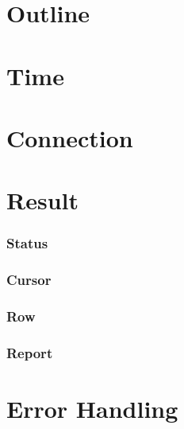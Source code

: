 \section{Outline}

\section{Time}

\section{Connection}

\section{Result}

\subsubsection{Status}
\subsubsection{Cursor}
\subsubsection{Row}
\subsubsection{Report}

\section{Error Handling}

